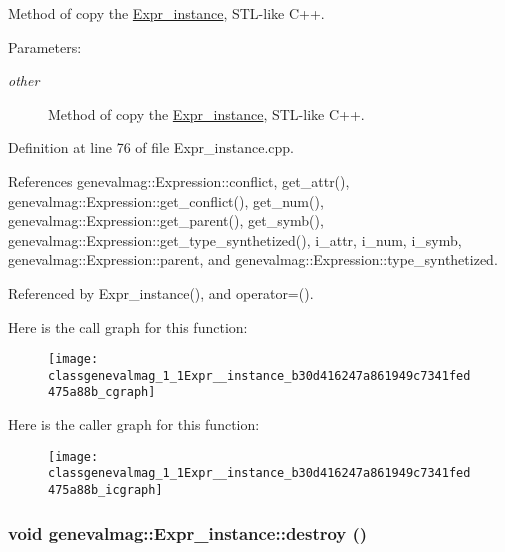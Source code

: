 Method of copy the \hyperlink{classgenevalmag_1_1Expr__instance}{Expr\_\-instance}, STL-like C++. \begin{Desc}
\item[Parameters:]
\begin{description}
\item[{\em other}]Method of copy the \hyperlink{classgenevalmag_1_1Expr__instance}{Expr\_\-instance}, STL-like C++. \end{description}
\end{Desc}


Definition at line 76 of file Expr\_\-instance.cpp.

References genevalmag::Expression::conflict, get\_\-attr(), genevalmag::Expression::get\_\-conflict(), get\_\-num(), genevalmag::Expression::get\_\-parent(), get\_\-symb(), genevalmag::Expression::get\_\-type\_\-synthetized(), i\_\-attr, i\_\-num, i\_\-symb, genevalmag::Expression::parent, and genevalmag::Expression::type\_\-synthetized.

Referenced by Expr\_\-instance(), and operator=().

Here is the call graph for this function:\nopagebreak
\begin{figure}[H]
\begin{center}
\leavevmode
\texttt{[image: classgenevalmag\_1\_1Expr\_\_instance\_b30d416247a861949c7341fed475a88b\_cgraph]}
\end{center}
\end{figure}


Here is the caller graph for this function:\nopagebreak
\begin{figure}[H]
\begin{center}
\leavevmode
\texttt{[image: classgenevalmag\_1\_1Expr\_\_instance\_b30d416247a861949c7341fed475a88b\_icgraph]}
\end{center}
\end{figure}
\hypertarget{classgenevalmag_1_1Expr__instance_ff5a483a323692e96deedecaff680de0}{
\subsubsection[{destroy}]{\setlength{\rightskip}{0pt plus 5cm}void genevalmag::Expr\_\-instance::destroy ()}}
\label{classgenevalmag_1_1Expr__instance_ff5a483a323692e96deedecaff680de0}


